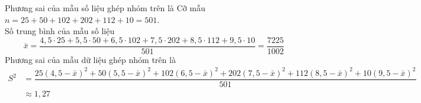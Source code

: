 \begin{bt}
\begin{center}
	\end{center}
	Phương sai của mẫu số liệu ghép nhóm trên là
	\loigiai
	{Cỡ mẫu $n=25+50+102+202+112+10=501$. \\
		Số trung bình của mẫu số liệu 
		$$\bar{x}=\dfrac{4{,}5 \cdot 25+5{,}5 \cdot 50+6{,}5 \cdot 102+7{,}5 \cdot 202+8{,}5 \cdot 112+9{,}5 \cdot 10}{501}=\dfrac{7225}{1002}$$
		Phương sai của mẫu dữ liệu ghép nhóm trên là
		\begin{align*}
		S^{2}&=\dfrac{25(4,5-\bar{x})^{2}+50(5,5-\bar{x})^{2}+102(6,5-\bar{x})^{2}+202(7,5-\bar{x})^{2}+112(8,5-\bar{x})^{2}+10(9,5-\bar{x})^{2}}{501} \\
		&\approx 1,27
		\end{align*}
	}
\end{bt}

